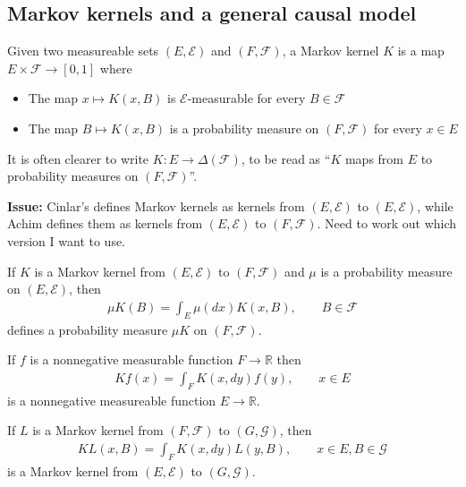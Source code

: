 \subsection{Markov kernels and a general causal model}

\begin{definition}
Given two measureable sets $(E,\mathcal{E})$ and $(F,\mathcal{F})$, a Markov kernel $K$ is a map $E\times \mathcal{F} \to [0,1]$ where
\begin{itemize}
    \item The map $x\mapsto K(x,B)$ is $\mathcal{E}$-measurable for every $B\in\mathcal{F}$
    \item The map $B\mapsto K(x,B)$ is a probability measure on $(F,\mathcal{F})$ for every $x\in E$ 
\end{itemize}

It is often clearer to write $K:E\to \Delta(\mathcal{F})$, to be read as ``$K$ maps from $E$ to probability measures on $(F,\mathcal{F})$''.

\textbf{Issue: }Cinlar's defines Markov kernels as kernels from $(E,\mathcal{E})$ to $(E,\mathcal{E})$, while Achim defines them as kernels from $(E,\mathcal{E})$ to $(F,\mathcal{F})$. Need to work out which version I want to use.
\end{definition}

\begin{definition}\label{def:kernel_products}
If $K$ is a Markov kernel from $(E,\mathcal{E})$ to $(F,\mathcal{F})$ and $\mu$ is a probability measure on $(E,\mathcal{E})$, then
\begin{align}
    \mu K(B)=\int_E \mu(dx) K(x, B),\qquad B\in\mathcal{F}
\end{align}
defines a probability measure $\mu K$ on $(F,\mathcal{F})$.

If $f$ is a nonnegative measurable function $F\to \mathbb{R}$ then
\begin{align}
    Kf(x) = \int_F K(x,dy)f(y), \qquad x\in E
\end{align}
is a nonnegative measureable function $E\to \mathbb{R}$.

If $L$ is a Markov kernel from $(F,\mathcal{F})$ to $(G,\mathcal{G})$, then
\begin{align}
    KL(x,B) = \int_F K(x,dy) L(y,B),\qquad x\in E, B\in \mathcal{G}
\end{align}
is a Markov kernel from $(E,\mathcal{E})$ to $(G,\mathcal{G})$. \cite{cinlar_probability_2011}
\end{definition}

